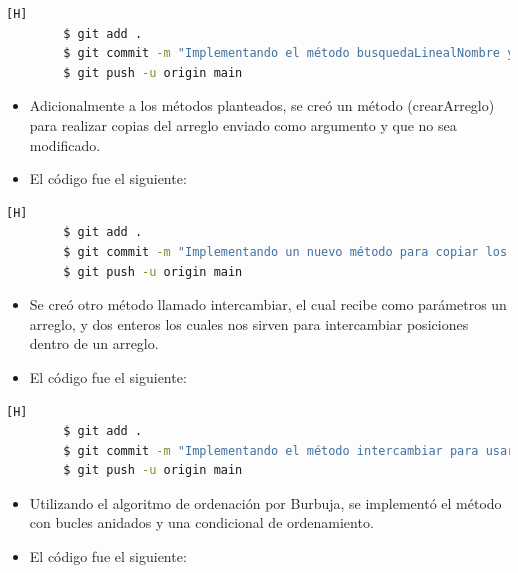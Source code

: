 \documentclass{article}
\begin{document}
    \begin{lstlisting}[language=bash,caption={Commit: Implementando el método busquedaLinealNombre y completando el main para recibir el nombre}][H]
		$ git add .
		$ git commit -m "Implementando el método busquedaLinealNombre y completando el main para recibir el nombre"			
		$ git push -u origin main
	\end{lstlisting}


    \begin{itemize}	
        \item Adicionalmente a los métodos planteados, se creó un método (crearArreglo) para realizar copias del arreglo enviado como argumento y que no sea modificado.
	\item El código fue el siguiente:
    \end{itemize}
    
    
    \begin{lstlisting}[language=bash,caption={Commit: Implementando un nuevo método para copiar los arreglos antes de usarlos en los futuros métodos}][H]
		$ git add .
		$ git commit -m "Implementando un nuevo método para copiar los arreglos antes de usarlos en los futuros métodos"			
		$ git push -u origin main
	\end{lstlisting}


 \begin{itemize}	
        \item Se creó otro método llamado intercambiar, el cual recibe como parámetros un arreglo, y dos enteros los cuales nos sirven para intercambiar posiciones dentro de un arreglo.
	\item El código fue el siguiente:
    \end{itemize}
    
    
    \begin{lstlisting}[language=bash,caption={Commit: Implementando el método intercambiar para usarlo en el ordenarPorNombreBurbuja}][H]
		$ git add .
		$ git commit -m "Implementando el método intercambiar para usarlo en el ordenarPorNombreBurbuja"			
		$ git push -u origin main
	\end{lstlisting}


 \begin{itemize}	
        \item Utilizando el algoritmo de ordenación por Burbuja, se implementó el método con bucles anidados y una condicional de ordenamiento.
	\item El código fue el siguiente:
    \end{itemize}
    
    
\end{document}
